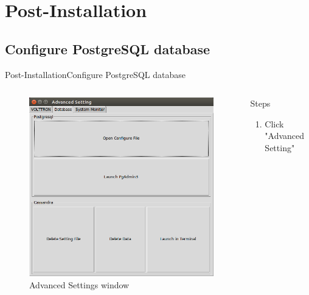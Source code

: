 \documentclass{beamer}
\begin{document}
\section{Post-Installation}

\subsection{Configure PostgreSQL database}
\begin{frame}{Post-Installation}{Configure PostgreSQL database}
\begin{columns}[T]
	\begin{column}{0.5\textwidth}
		\begin{figure}
			\includegraphics[scale=0.2]{figs/advancedSettings.png}
			\caption{Advanced Settings window}
		\end{figure}
	\end{column}
	\begin{column}{0.5\textwidth}
		\begin{block}{Steps}
			\begin{enumerate}	
				\item Click "Advanced Setting"
			\end{enumerate}		
		\end{block}
	\end{column}
\end{columns}
\end{frame}
\end{document}
